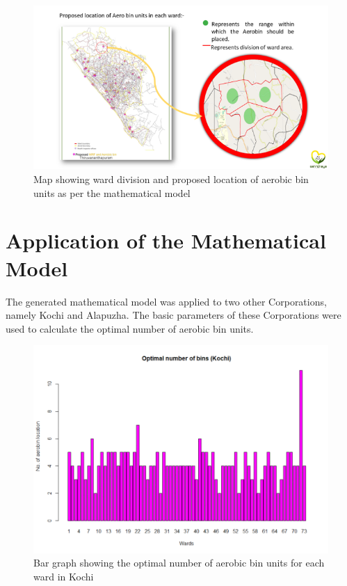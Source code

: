 \documentclass[12pt,a4paper]{report}
\begin{document}
\begin{figure}[H]
	\centering
	\includegraphics[width=1\linewidth]{bin_loc}
	\caption{Map showing ward division and proposed location of aerobic bin units as per the mathematical model}
	\label{fig:binloc}
\end{figure}

\newpage
\section{\textbf{Application of the Mathematical Model}}
The generated mathematical model was applied to two other Corporations, namely Kochi and Alapuzha. The basic parameters of these Corporations were used to calculate the optimal number of aerobic bin units.

\begin{figure}[H]
	\centering
	\includegraphics[width=0.7\linewidth]{kochi}
	\caption{Bar graph showing the optimal number of aerobic bin units for each ward in Kochi}
	\label{fig:kochi}
\end{figure}
\end{document}
